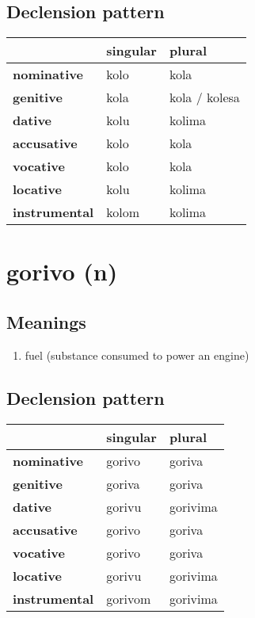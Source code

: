 \subsection*{Declension pattern}
\begin{tabularx}{\linewidth}{Xll}
\toprule
{} & singular &         plural \\
\midrule
\textbf{nominative  } &     kolo &           kola \\
\textbf{genitive    } &     kola &  kola / kolesa \\
\textbf{dative      } &     kolu &         kolima \\
\textbf{accusative  } &     kolo &           kola \\
\textbf{vocative    } &     kolo &           kola \\
\textbf{locative    } &     kolu &         kolima \\
\textbf{instrumental} &    kolom &         kolima \\
\bottomrule
\end{tabularx}

\filbreak
\section{gorivo (n)}
\subsection*{Meanings}
\begin{enumerate}
\item fuel (substance consumed to power an engine)
\end{enumerate}
\subsection*{Declension pattern}
\begin{tabularx}{\linewidth}{Xll}
\toprule
{} & singular &    plural \\
\midrule
\textbf{nominative  } &   gorivo &    goriva \\
\textbf{genitive    } &   goriva &    goriva \\
\textbf{dative      } &   gorivu &  gorivima \\
\textbf{accusative  } &   gorivo &    goriva \\
\textbf{vocative    } &   gorivo &    goriva \\
\textbf{locative    } &   gorivu &  gorivima \\
\textbf{instrumental} &  gorivom &  gorivima \\
\bottomrule
\end{tabularx}

